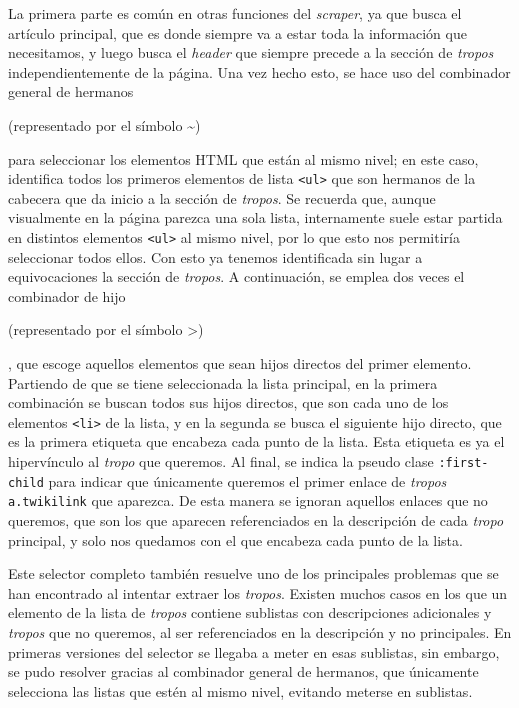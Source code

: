 La primera parte es común en otras funciones del \textit{scraper}, ya que busca
el artículo principal, que es donde siempre va a estar toda la información que
necesitamos, y luego busca el \textit{header} que siempre precede a la sección de
\textit{tropos} independientemente de la página. Una vez hecho esto, se hace uso
del combinador general de hermanos
\begin{otherlanguage}{english}(representado por el símbolo
\textasciitilde)\end{otherlanguage} para seleccionar los elementos HTML que
están al mismo nivel; en este caso, identifica todos los primeros elementos de
lista \texttt{<ul>} que son hermanos de la cabecera que da inicio a la sección
de \textit{tropos}. Se recuerda que, aunque visualmente en la página parezca una
sola lista, internamente suele estar partida en distintos elementos \texttt{<ul>} 
al mismo nivel, por lo que esto nos permitiría seleccionar todos
ellos. Con esto ya tenemos identificada sin lugar a equivocaciones la sección de
\textit{tropos}. A continuación, se emplea dos veces el combinador de hijo
\begin{otherlanguage}{english}(representado por el símbolo
\textgreater)\end{otherlanguage}, que escoge aquellos elementos que sean hijos
directos del primer elemento. Partiendo de que se tiene seleccionada la lista
principal, en la primera combinación se buscan todos sus hijos directos, que son
cada uno de los elementos \texttt{<li>} de la lista, y en la segunda se busca el
siguiente hijo directo, que es la primera etiqueta que encabeza cada punto de la
lista. Esta etiqueta es ya el hipervínculo al \textit{tropo} que queremos. Al
final, se indica la pseudo clase \texttt{:first-child} para indicar que
únicamente queremos el primer enlace de \textit{tropos} \texttt{a.twikilink} que
aparezca. De esta manera se ignoran aquellos enlaces que no queremos, que son
los que aparecen referenciados en la descripción de cada \textit{tropo}
principal, y solo nos quedamos con el que encabeza cada punto de la lista.

Este selector completo también resuelve uno de los principales problemas que se
han encontrado al intentar extraer los \textit{tropos}. Existen muchos casos en
los que un elemento de la lista de \textit{tropos} contiene sublistas con
descripciones adicionales y \textit{tropos} que no queremos, al ser
referenciados en la descripción y no principales. En primeras versiones del
selector se llegaba a meter en esas sublistas, sin embargo, se pudo resolver
gracias al combinador general de hermanos, que únicamente selecciona las listas
que estén al mismo nivel, evitando meterse en sublistas. 

